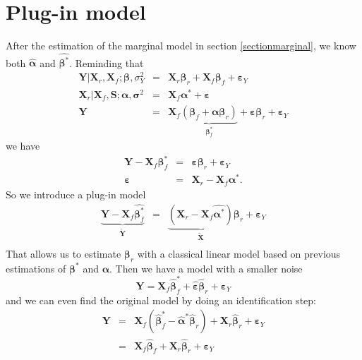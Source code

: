 \documentclass[12pt,a4paper]{report}
\begin{document}
	\section{Plug-in model}
		After the estimation of the marginal model in section \ref{sectionmarginal}, we know both $\hat{\boldsymbol{\alpha}}$ and $\hat{\boldsymbol{\beta}^*}$. Reminding that
		\begin{eqnarray}
			\boldsymbol{Y}|\boldsymbol{X}_r,\boldsymbol{X}_f;\boldsymbol{\beta},\sigma_Y^2&=& \boldsymbol{X}_r\boldsymbol{\beta}_r+\boldsymbol{X}_f\boldsymbol{\beta}_f+\boldsymbol{\varepsilon}_Y \\
			\boldsymbol{X}_r|\boldsymbol{X}_f,\boldsymbol{S};\boldsymbol{\alpha},\boldsymbol{\sigma}^2&=&\boldsymbol{X}_f\boldsymbol{\alpha}^*+\boldsymbol{\varepsilon} \\
			\boldsymbol{Y}&=& \boldsymbol{X}_f\underbrace{(\boldsymbol{\beta}_f+\boldsymbol{\alpha}\boldsymbol{\beta}_r)}_{\boldsymbol{\beta}^*_f}+\boldsymbol{\varepsilon}\boldsymbol{\beta}_r+\boldsymbol{\varepsilon}_Y
					\end{eqnarray}		 
		we have
		\begin{eqnarray}
			\boldsymbol{Y}- \boldsymbol{X}_f\boldsymbol{\beta}^*_f&=&\boldsymbol{\varepsilon}\boldsymbol{\beta}_r+\boldsymbol{\varepsilon}_Y \\
			\boldsymbol{\varepsilon}&=&\boldsymbol{X}_r-\boldsymbol{X}_f\boldsymbol{\alpha}^*.
		\end{eqnarray}		 
		So we introduce a plug-in model
		\begin{eqnarray}
			\underbrace{\boldsymbol{Y}- \boldsymbol{X}_f\hat{\boldsymbol{\beta}^*_f}}_{\tilde{\boldsymbol{Y}}}&=&\underbrace{(\boldsymbol{X}_r-\boldsymbol{X}_f\hat{\boldsymbol{\alpha}^*})}_{\tilde{\boldsymbol{X}}}\boldsymbol{\beta}_r+\boldsymbol{\varepsilon}_Y \\
		\end{eqnarray}
		That allows us to estimate $\boldsymbol{\beta}_{r}$ with a classical linear model based on previous estimations of $\boldsymbol{\beta}^*$ and $\boldsymbol{\alpha}$.
		Then we have a model with a smaller noise
		\begin{equation}
			\boldsymbol{Y}= \boldsymbol{X}_f\hat{\boldsymbol{\beta}}^*_f + \hat{\boldsymbol{\varepsilon}}\hat{\boldsymbol{\beta}}_{r}+\boldsymbol{\varepsilon}_Y 
		\end{equation}
		and we can even find the original model by doing an identification step:
		\begin{eqnarray}
			\boldsymbol{Y}&=& \boldsymbol{X}_f(\hat{\boldsymbol{\beta}}^*_f-\hat{\boldsymbol{\alpha}}^*\hat{\boldsymbol{\beta}}_{r}) + \boldsymbol{X}_r\hat{\boldsymbol{\beta}}_{r}+\boldsymbol{\varepsilon}_Y \\
			&=&\boldsymbol{X}_f\hat{\boldsymbol{\beta}}_f+\boldsymbol{X}_r\hat{\boldsymbol{\beta}}_r+\boldsymbol{\varepsilon}_Y
		\end{eqnarray}
	
\end{document}
